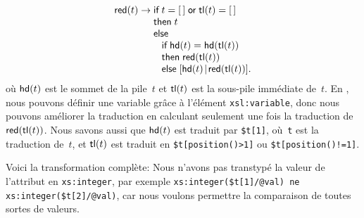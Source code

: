 \begin{equation*}
\begin{array}{@{}r@{\;}c@{\;}l@{}}
\fun{red}(t) & \rightarrow & \fun{if} \; t=\el\; \fun{or} \;
                             \fun{tl}(t)=\el\\
             &             & \fun{then} \; t\\
             &             & \fun{else}\\
             &             & \;\;\; \fun{if} \; \fun{hd}(t) = \fun{hd}(\fun{tl}(t))\\
             &             & \;\;\; \fun{then} \; \fun{red}(\fun{tl}(t))\\
             &             & \;\;\; \fun{else} \; \cons{\fun{hd}(t)}{\fun{red}(\fun{tl}(t))}.
\end{array}
\end{equation*}
où \(\textsf{hd}(t)\)  est le sommet de la
pile~\(t\) et \(\textsf{tl}(t)\)  est la sous-pile
immédiate de~\(t\). En \XSLT, nous pouvons définir une variable grâce
à l'élément \texttt{xsl:variable}, donc nous pouvons améliorer la
traduction en calculant seulement une fois la traduction de
\(\textsf{red}(\textsf{tl}(t))\). Nous savons aussi que \(\textsf{hd}(t)\) est
traduit par \texttt{\$t[1]}, où~\texttt{t} est la traduction de~\(t\),
et \(\textsf{tl}(t)\) est traduit en \texttt{\$t[position()>1]} ou
\texttt{\$t[position()!=1]}.

Voici la transformation complète: 
\noindent Nous n'avons pas transtypé la valeur de l'attribut en
\texttt{xs:integer}, par exemple \texttt{xs:integer(\$t[1]/@val) ne
  xs:integer(\$t[2]/@val)}, car nous voulons permettre la comparaison
de toutes sortes de valeurs.

\label{par:merging}

